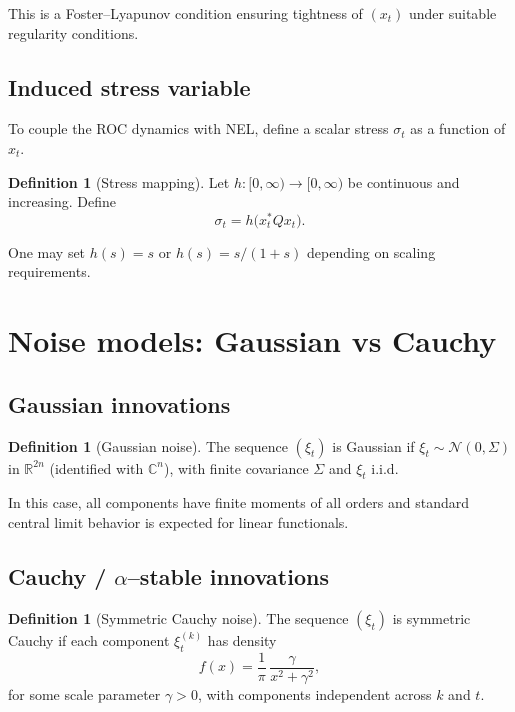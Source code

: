 \documentclass[11pt]{article}
\theoremstyle{plain}
\theoremstyle{definition}
\newtheorem{definition}[theorem]{Definition}
\numberwithin{equation}{section}
\begin{document}
This is a Foster--Lyapunov condition ensuring tightness of $(x_t)$
under suitable regularity conditions.

\subsection{Induced stress variable}

To couple the ROC dynamics with NEL, define a scalar stress
$\sigma_t$ as a function of $x_t$.

\begin{definition}[Stress mapping]
Let $h : [0,\infty) \to [0,\infty)$ be continuous and increasing.
Define
\begin{equation}
  \sigma_t = h\bigl(x_t^\ast Q x_t\bigr).
  \label{eq:stress-from-roc}
\end{equation}
\end{definition}

One may set $h(s) = s$ or $h(s) = s / (1+s)$ depending on scaling
requirements.

\section{Noise models: Gaussian vs Cauchy}

\subsection{Gaussian innovations}

\begin{definition}[Gaussian noise]
The sequence $(\xi_t)$ is Gaussian if
$\xi_t \sim \mathcal{N}(0,\Sigma)$ in $\mathbb{R}^{2n}$ (identified
with $\mathbb{C}^n$), with finite covariance $\Sigma$ and
$\xi_t$ i.i.d.
\end{definition}

In this case, all components have finite moments of all orders and
standard central limit behavior is expected for linear functionals.

\subsection{Cauchy / $\alpha$--stable innovations}

\begin{definition}[Symmetric Cauchy noise]
The sequence $(\xi_t)$ is symmetric Cauchy if each component
$\xi^{(k)}_t$ has density
\begin{equation}
  f(x) = \frac{1}{\pi}\, \frac{\gamma}{x^2 + \gamma^2},
\end{equation}
for some scale parameter $\gamma > 0$, with components independent
across $k$ and $t$.
\end{definition}
\end{document}
